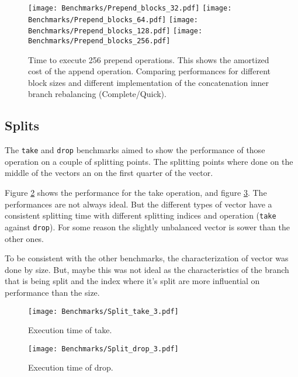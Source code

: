 \begin{figure}[h!]
  \centering
  \texttt{[image: Benchmarks/Prepend\_blocks\_32.pdf]}
  \texttt{[image: Benchmarks/Prepend\_blocks\_64.pdf]}
  \texttt{[image: Benchmarks/Prepend\_blocks\_128.pdf]}
  \texttt{[image: Benchmarks/Prepend\_blocks\_256.pdf]}
  \caption{Time to execute 256 prepend operations. This shows the amortized cost of the append operation. Comparing performances for different block sizes and different implementation of the concatenation inner branch rebalancing (Complete/Quick).}
  \label{PrependBlocksBenchmarks}
\end{figure}

\FloatBarrier

\subsection{Splits}
The \texttt{take} and \texttt{drop} benchmarks aimed to show the performance of those operation on a couple of splitting points. The splitting points where done on the middle of the vectors an on the first quarter of the vector. 
  
Figure \ref{TakeBenchmarks} shows the performance for the take operation, and figure \ref{DropBenchmarks}. The performances are not always ideal. But the different types of vector have a consistent splitting time with different splitting indices and operation (\texttt{take} against \texttt{drop}). For some reason the slightly unbalanced vector is sower than the other ones.  
 
To be consistent with the other benchmarks, the characterization of vector was done by size. But, maybe this was not ideal as the characteristics of the branch that is being split and the index where it's split are more influential on performance than the size. 


\begin{figure}[h!]
  \centering
  \texttt{[image: Benchmarks/Split\_take\_3.pdf]}
  \caption{Execution time of take.}
  \label{TakeBenchmarks}
\end{figure}


\begin{figure}[h!]
  \centering
  \texttt{[image: Benchmarks/Split\_drop\_3.pdf]}
  \caption{Execution time of drop.}
  \label{DropBenchmarks}
\end{figure}


